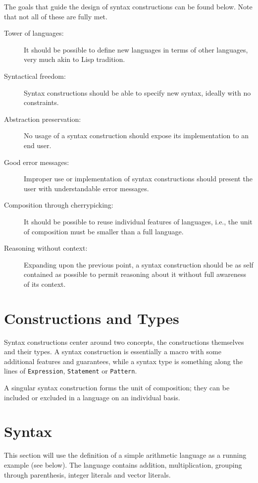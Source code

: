 \documentclass{kththesis}
\begin{document}
The goals that guide the design of syntax constructions can be found below. Note that not all of these are fully met.

\begin{description}
  \item[Tower of languages:] It should be possible to define new languages in terms of other languages, very much akin to Lisp tradition.
  \item[Syntactical freedom:] Syntax constructions should be able to specify new syntax, ideally with no constraints.
  \item[Abstraction preservation:] No usage of a syntax construction should expose its implementation to an end user.
  \item[Good error messages:] Improper use or implementation of syntax constructions should present the user with understandable error messages.
  \item[Composition through cherrypicking:] It should be possible to reuse individual features of languages, i.e., the unit of composition must be smaller than a full language.
  \item[Reasoning without context:] Expanding upon the previous point, a syntax construction should be as self contained as possible to permit reasoning about it without full awareness of its context.
\end{description}

\section{Constructions and Types} \label{sec:constructions-and-types}

Syntax constructions center around two concepts, the constructions themselves and their types. A syntax construction is essentially a macro with some additional features and guarantees, while a syntax type is something along the lines of \texttt{Expression}, \texttt{Statement} or \texttt{Pattern}.

A singular syntax construction forms the unit of composition; they can be included or excluded in a language on an individual basis.

\section{Syntax} \label{sec:design-syntax}

This section will use the definition of a simple arithmetic language as a running example (see below). The language contains addition, multiplication, grouping through parenthesis, integer literals and vector literals.
\end{document}
